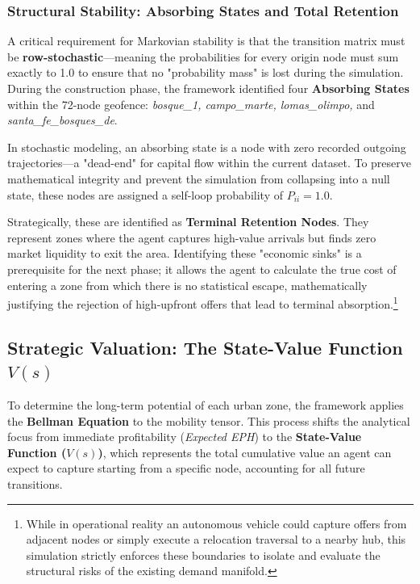 \subsubsection{Structural Stability: Absorbing States and Total Retention}

A critical requirement for Markovian stability is that the transition matrix must be \textbf{row-stochastic}---meaning the probabilities for every origin node must sum exactly to 1.0 to ensure that no "probability mass" is lost during the simulation. During the construction phase, the framework identified four \textbf{Absorbing States} within the 72-node geofence: \textit{bosque\_1, campo\_marte, lomas\_olimpo,} and \textit{santa\_fe\_bosques\_de}.

In stochastic modeling, an absorbing state is a node with zero recorded outgoing trajectories---a "dead-end" for capital flow within the current dataset. To preserve mathematical integrity and prevent the simulation from collapsing into a null state, these nodes are assigned a self-loop probability of $P_{ii} = 1.0$. 

Strategically, these are identified as \textbf{Terminal Retention Nodes}. They represent zones where the agent captures high-value arrivals but finds zero market liquidity to exit the area. Identifying these "economic sinks" is a prerequisite for the next phase; it allows the agent to calculate the true cost of entering a zone from which there is no statistical escape, mathematically justifying the rejection of high-upfront offers that lead to terminal absorption.\footnote{While in operational reality an autonomous vehicle could capture offers from adjacent nodes or simply execute a relocation traversal to a nearby hub, this simulation strictly enforces these boundaries to isolate and evaluate the structural risks of the existing demand manifold.}



\subsection{Strategic Valuation: The State-Value Function $V(s)$}

To determine the long-term potential of each urban zone, the framework applies the \textbf{Bellman Equation} to the mobility tensor. This process shifts the analytical focus from immediate profitability (\textit{Expected EPH}) to the \textbf{State-Value Function ($V(s)$)}, which represents the total cumulative value an agent can expect to capture starting from a specific node, accounting for all future transitions.

